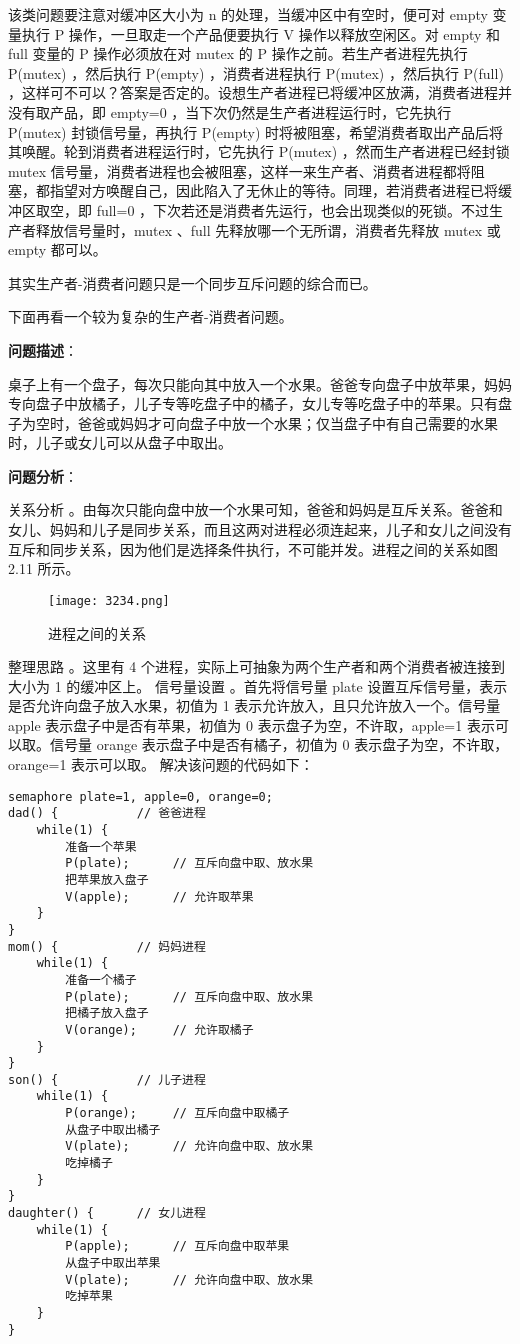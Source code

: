\documentclass{ctexbook}
\begin{document}
该类问题要注意对缓冲区大小为 n 的处理，当缓冲区中有空时，便可对 empty 变量执行 P 操作，一旦取走一个产品便要执行 V 操作以释放空闲区。对 empty 和 full 变量的 P 操作必须放在对 mutex 的 P 操作之前。若生产者进程先执行 P(mutex) ，然后执行 P(empty) ，消费者进程执行 P(mutex) ，然后执行 P(full) ，这样可不可以？答案是否定的。设想生产者进程已将缓冲区放满，消费者进程并没有取产品，即 empty=0 ，当下次仍然是生产者进程运行时，它先执行 P(mutex) 封锁信号量，再执行 P(empty) 时将被阻塞，希望消费者取出产品后将其唤醒。轮到消费者进程运行时，它先执行 P(mutex) ，然而生产者进程已经封锁 mutex 信号量，消费者进程也会被阻塞，这样一来生产者、消费者进程都将阻塞，都指望对方唤醒自己，因此陷入了无休止的等待。同理，若消费者进程已将缓冲区取空，即 full=0 ，下次若还是消费者先运行，也会出现类似的死锁。不过生产者释放信号量时，mutex 、full 先释放哪一个无所谓，消费者先释放 mutex 或 empty 都可以。

其实生产者-消费者问题只是一个同步互斥问题的综合而已。

下面再看一个较为复杂的生产者-消费者问题。

\textbf{问题描述}：

桌子上有一个盘子，每次只能向其中放入一个水果。爸爸专向盘子中放苹果，妈妈专向盘子中放橘子，儿子专等吃盘子中的橘子，女儿专等吃盘子中的苹果。只有盘子为空时，爸爸或妈妈才可向盘子中放一个水果；仅当盘子中有自己需要的水果时，儿子或女儿可以从盘子中取出。

\textbf{问题分析}：

关系分析 。由每次只能向盘中放一个水果可知，爸爸和妈妈是互斥关系。爸爸和女儿、妈妈和儿子是同步关系，而且这两对进程必须连起来，儿子和女儿之间没有互斥和同步关系，因为他们是选择条件执行，不可能并发。进程之间的关系如图 2.11 所示。
\begin{figure}[h]
	\centering
	\texttt{[image: 3234.png]}
	\caption{进程之间的关系}
	\label{fig:process_relationships}
\end{figure}

整理思路 。这里有 4 个进程，实际上可抽象为两个生产者和两个消费者被连接到大小为 1 的缓冲区上。
信号量设置 。首先将信号量 plate 设置互斥信号量，表示是否允许向盘子放入水果，初值为 1 表示允许放入，且只允许放入一个。信号量 apple 表示盘子中是否有苹果，初值为 0 表示盘子为空，不许取，apple=1 表示可以取。信号量 orange 表示盘子中是否有橘子，初值为 0 表示盘子为空，不许取，orange=1 表示可以取。
解决该问题的代码如下：
\begin{lstlisting}
semaphore plate=1, apple=0, orange=0;
dad() {           // 爸爸进程
	while(1) {
		准备一个苹果
		P(plate);      // 互斥向盘中取、放水果
		把苹果放入盘子
		V(apple);      // 允许取苹果
	}
}
mom() {           // 妈妈进程
	while(1) {
		准备一个橘子
		P(plate);      // 互斥向盘中取、放水果
		把橘子放入盘子
		V(orange);     // 允许取橘子
	}
}
son() {           // 儿子进程
	while(1) {
		P(orange);     // 互斥向盘中取橘子
		从盘子中取出橘子
		V(plate);      // 允许向盘中取、放水果
		吃掉橘子
	}
}
daughter() {      // 女儿进程
	while(1) {
		P(apple);      // 互斥向盘中取苹果
		从盘子中取出苹果
		V(plate);      // 允许向盘中取、放水果
		吃掉苹果
	}
}
\end{lstlisting}
\end{document}

